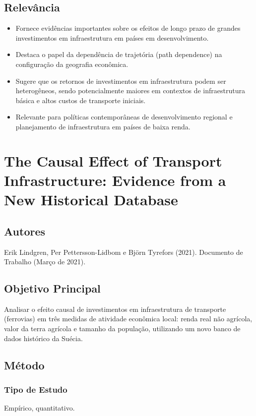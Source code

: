 \documentclass[12pt]{article}
\begin{document}
\subsection*{Relevância}
\begin{itemize}
    \item Fornece evidências importantes sobre os efeitos de longo prazo de grandes investimentos em infraestrutura em países em desenvolvimento.
    \item Destaca o papel da dependência de trajetória (path dependence) na configuração da geografia econômica.
    \item Sugere que os retornos de investimentos em infraestrutura podem ser heterogêneos, sendo potencialmente maiores em contextos de infraestrutura básica e altos custos de transporte iniciais.
    \item Relevante para políticas contemporâneas de desenvolvimento regional e planejamento de infraestrutura em países de baixa renda.
\end{itemize}

\newpage

\section{The Causal Effect of Transport Infrastructure: Evidence from a New Historical Database}

\subsection*{Autores}
Erik Lindgren, Per Pettersson-Lidbom e Björn Tyrefors (2021). Documento de Trabalho (Março de 2021).

\subsection*{Objetivo Principal}
Analisar o efeito causal de investimentos em infraestrutura de transporte (ferrovias) em três medidas de atividade econômica local: renda real não agrícola, valor da terra agrícola e tamanho da população, utilizando um novo banco de dados histórico da Suécia.

\subsection*{Método}

\subsubsection*{Tipo de Estudo}
Empírico, quantitativo.
\end{document}
